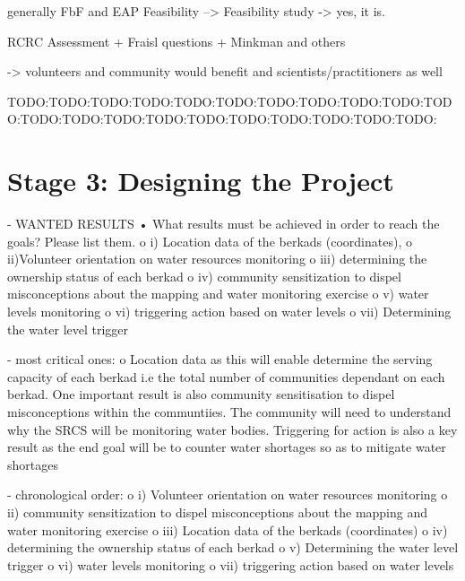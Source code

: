 generally FbF and EAP Feasibility --> Feasibility study -> yes, it is.

RCRC Assessment + Fraisl questions + Minkman and others

-> volunteers and community would benefit and scientists/practitioners as well




TODO:TODO:TODO:TODO:TODO:TODO:TODO:TODO:TODO:TODO:TODO:TODO:TODO:TODO:TODO:TODO:TODO:TODO:TODO:TODO:TODO:
\section{Stage 3: Designing the Project}

- WANTED RESULTS
•	What results must be achieved in order to reach the goals? Please list them.
o	i) Location data of the berkads (coordinates),
o	ii)Volunteer orientation on water resources monitoring
o	iii) determining the ownership status of each berkad
o	iv) community sensitization to dispel misconceptions about the mapping and water monitoring exercise
o	v) water levels monitoring
o	vi) triggering action based on water levels
o	vii) Determining the water level trigger

- most critical ones:
o	Location data as this will enable determine the serving capacity of each berkad i.e the total number of communities dependant on each berkad. One important result is also community sensitisation to dispel misconceptions within the communtiies. The community will need to understand why the SRCS will be monitoring water bodies. Triggering for action is also a key result as the end goal will be to counter water shortages so as to mitigate water shortages

- chronological order:
o	i) Volunteer orientation on water resources monitoring
o	ii) community sensitization to dispel misconceptions about the mapping and water monitoring exercise
o	iii) Location data of the berkads (coordinates)
o	iv) determining the ownership status of each berkad
o	v) Determining the water level trigger
o	vi) water levels monitoring
o	vii) triggering action based on water levels

